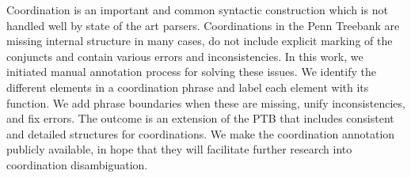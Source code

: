 Coordination is an important and common syntactic construction which is not handled well by state of the art parsers. Coordinations in the Penn Treebank are missing internal structure in many cases, do not include explicit marking of the conjuncts and contain various errors and inconsistencies. In this work, we initiated manual annotation process for solving these issues. We identify the different elements in a coordination phrase and label each element with its function. We add phrase boundaries when these are missing, unify inconsistencies, and fix errors. The outcome is an extension of the PTB that includes consistent and detailed structures for coordinations. We make the coordination annotation publicly available, in hope that they will facilitate further research into coordination disambiguation.

